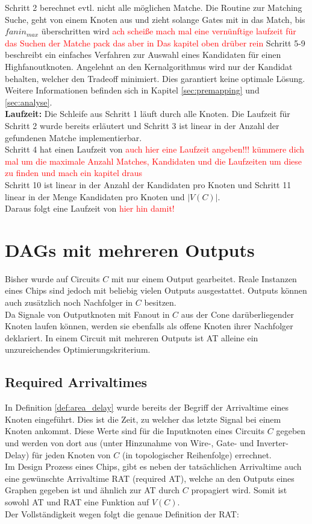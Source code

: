 \documentclass[11pt, a4paper, german]{article}
\begin{document}
Schritt 2 berechnet evtl. nicht alle möglichen Matche. Die Routine zur Matching Suche, geht von einem Knoten aus und zieht solange Gates mit in das Match, bis $fanin_{max}$ überschritten wird \textcolor{red}{ach scheiße mach mal eine vernünftige laufzeit für das Suchen der Matche pack das aber in Das kapitel oben drüber rein}
Schritt 5-9 beschreibt ein einfaches Verfahren zur Auswahl eines Kandidaten für einen Highfanoutknoten. Angelehnt an den Kernalgorithmus wird nur der Kandidat behalten, welcher den Tradeoff minimiert. Dies garantiert keine optimale Lösung. Weitere Informationen befinden sich in Kapitel \ref{sec:premapping} und \ref{sec:analyse}. \\
{\bf Laufzeit: } Die Schleife aus Schritt 1 läuft durch alle Knoten. Die Laufzeit für Schritt 2 wurde bereits erläutert und Schritt 3 ist linear in der Anzahl der gefundenen Matche implementierbar. \\
Schritt 4 hat einen Laufzeit von \textcolor{red}{auch hier eine Laufzeit angeben!!! kümmere dich mal um die maximale Anzahl Matches, Kandidaten und die Laufzeiten um diese zu finden und mach ein kapitel draus }\\
Schritt 10 ist linear in der Anzahl der Kandidaten pro Knoten und Schritt 11 linear in der Menge Kandidaten pro Knoten und $|V(C)|$.\\
Daraus folgt eine Laufzeit von \textcolor{red}{hier hin damit!}



\section{DAGs mit mehreren Outputs}
\label{sec:outputs}
Bisher wurde auf Circuits $C$ mit nur einem Output gearbeitet. Reale Instanzen eines Chips sind jedoch mit beliebig vielen Outputs ausgestattet. Outputs können auch zusätzlich noch Nachfolger in $C$ besitzen. \\

 Da Signale von Outputknoten mit Fanout in $C$ aus der Cone darüberliegender Knoten laufen können, werden sie ebenfalls als offene Knoten ihrer Nachfolger deklariert. In einem Circuit mit mehreren Outputs ist AT alleine ein unzureichendes Optimierungskriterium.
\subsection{Required Arrivaltimes}
\label{subsec:rat}
In Definition \ref{def:area_delay} wurde bereits der Begriff der Arrivaltime eines Knoten eingeführt. Dies ist die Zeit, zu welcher das letzte Signal bei einem Knoten ankommt. Diese Werte sind für die Inputknoten eines Circuits $C$ gegeben und werden von dort aus (unter Hinzunahme von Wire-, Gate- und Inverter-Delay) für jeden Knoten von $C$ (in topologischer Reihenfolge) errechnet.\\
Im Design Prozess eines Chips, gibt es neben der tatsächlichen Arrivaltime auch eine  gewünschte Arrivaltime RAT (required AT), welche an den Outputs eines Graphen gegeben ist und ähnlich zur AT durch $C$ propagiert wird. Somit ist sowohl AT und RAT eine Funktion auf $V(C)$. \\
Der Vollständigkeit wegen folgt die genaue Definition der RAT:\\
\end{document}
